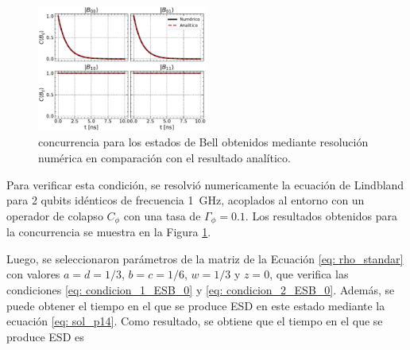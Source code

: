 \begin{figure} [htbp]
    \centering
    \includegraphics[width=0.5\textwidth]{figures/concurrence_bell_states.pdf}
    \caption{concurrencia para los estados de Bell obtenidos mediante resolución numérica en comparación con el resultado analítico.}
    \label{fig: concurrencia_estados_bell}
\end{figure}

Para verificar esta condición, se resolvió numericamente la ecuación de Lindbland para 2 qubits idénticos de frecuencia \SI{1}{\giga\hertz}, acoplados al entorno con un operador de colapso \(C_\phi\) con una tasa de \(\Gamma_\phi = 0.1\). Los resultados obtenidos para la concurrencia se muestra en la Figura \ref{fig: concurrencia_estados_bell}.


Luego, se seleccionaron parámetros de la matriz de la Ecuación \ref{eq: rho_standar} con valores \(a = d = 1/3\), \(b = c = 1/6\), \(w = 1/3\) y \(z = 0\), que verifica las condiciones \ref{eq: condicion_1_ESB_0} y \ref{eq: condicion_2_ESB_0}. Además, se puede obtener el tiempo en el que se produce ESD en este estado mediante la ecuación \ref{eq: sol_p14}. Como resultado, se obtiene que el tiempo en el que se produce ESD es 

